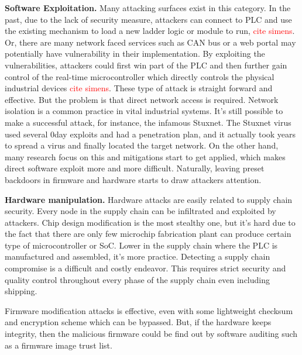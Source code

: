 \textbf{Software Exploitation.} Many attacking surfaces exist in this category. In the past, due to the lack of security measure, attackers can connect to PLC and use the existing mechanism to load a new ladder logic or module to run, \textcolor{red}{cite simens}. Or, there are many network faced services such as CAN bus or a web portal may potentially have vulnerability in their implementation. By exploiting the vulnerabilities, attackers could first win part of the PLC and then further gain control of the real-time microcontroller which directly controls the physical industrial devices \textcolor{red}{cite simens}. These type of attack is straight forward and effective. But the problem is that direct network access is required. Network isolation is a common practice in vital industrial systems. It's still possible to make a successful attack, for instance, the infamous Stuxnet. The Stuxnet virus used several 0day exploits and had a  penetration plan, and it actually took years to spread a virus and finally located the target network. On the other hand, many research focus on this and mitigations start to get applied, which makes direct software exploit more and more difficult. Naturally, leaving preset backdoors in firmware and hardware starts to draw attackers attention.  


\textbf{Hardware manipulation.} Hardware attacks are easily related to supply chain security. Every node in the supply chain can be infiltrated and exploited by attackers. Chip design modification is the most stealthy one, but it's hard due to the fact that there are only few microchip fabrication plant can produce certain type of microcontroller or SoC. Lower in the supply chain where the PLC is manufactured and assembled, it's more practice. Detecting a supply chain compromise is a difficult and costly endeavor. This requires strict security and quality control throughout every phase of the supply chain even including shipping.

Firmware modification attacks is effective, even with some lightweight checksum and encryption scheme which can be bypassed. But, if the hardware keeps integrity, then the malicious firmware could be find out by software auditing such as a firmware image trust list.

